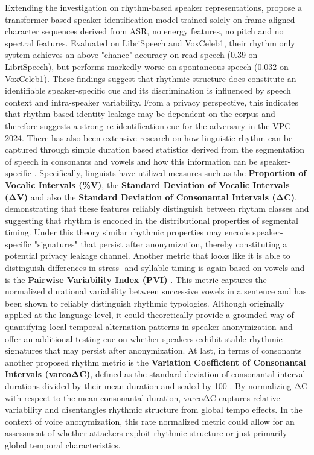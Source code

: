 \documentclass[12pt,leqno,a4paper]{article}
\begin{document}
Extending the investigation on rhythm-based speaker representations, \cite{mehlman_rhythm_2025} propose a transformer-based speaker identification 
model trained solely on frame-aligned character sequences derived from ASR, no energy features, no pitch and no spectral features. 
Evaluated on LibriSpeech and VoxCeleb1, their rhythm only system achieves an above "chance" accuracy on read speech (0.39 on LibriSpeech), 
but performs markedly worse on spontaneous speech (0.032 on VoxCeleb1). These findings suggest that rhythmic structure does constitute an 
identifiable speaker-specific cue and its discrimination is influenced by speech context and intra-speaker variability. 
From a privacy perspective, this indicates that rhythm-based identity leakage may be dependent on the corpus and therefore suggests a strong re-identification cue for the adversary in the VPC 2024. 
There has also been extensive research on how linguistic rhythm can be captured through simple duration based statistics derived from the 
segmentation of speech in consonants and vowels and how this information can be speaker-specific \citep{ramus_correlates_1999}. 
Specifically, linguists have utilized measures such as the \textbf{Proportion of Vocalic Intervals (\%V)}, the \textbf{Standard Deviation of Vocalic Intervals (ΔV)} and also 
the \textbf{Standard Deviation of Consonantal Intervals (ΔC)}, demonstrating that these features reliably distinguish between rhythm classes and suggesting that rhythm is encoded in the 
distributional properties of segmental timing. Under this theory similar rhythmic properties  may encode speaker-specific "signatures" that persist 
after anonymization, thereby constituting a potential privacy leakage channel. Another metric that looks like it is able to distinguish differences 
in stress- and syllable-timing is again based on vowels and is the \textbf{Pairwise Variability Index (PVI)} \citep{ling_q_2000}. 
This metric captures the normalized durational variability between successive vowels in a sentence and has been shown to reliably distinguish 
rhythmic typologies. Although originally applied at the language level, it could theoretically provide a grounded way of quantifying local temporal 
alternation patterns in speaker anonymization and offer an additional testing cue on whether speakers exhibit stable rhythmic signatures that may 
persist after anonymization. At last, in terms of consonants another proposed rhythm metric is the \textbf{Variation Coefficient of Consonantal Intervals (varcoΔC)}, 
defined as the standard deviation of consonantal interval durations divided by their mean duration and scaled by 100 \citep{dellwo_rhythm_nodate}. 
By normalizing ΔC with respect to the mean consonantal duration, varcoΔC captures relative variability and disentangles rhythmic structure from global tempo effects. 
In the context of voice anonymization, this rate normalized metric could allow for an assessment of whether attackers exploit rhythmic structure or just primarily global temporal characteristics.
 
\end{document}
